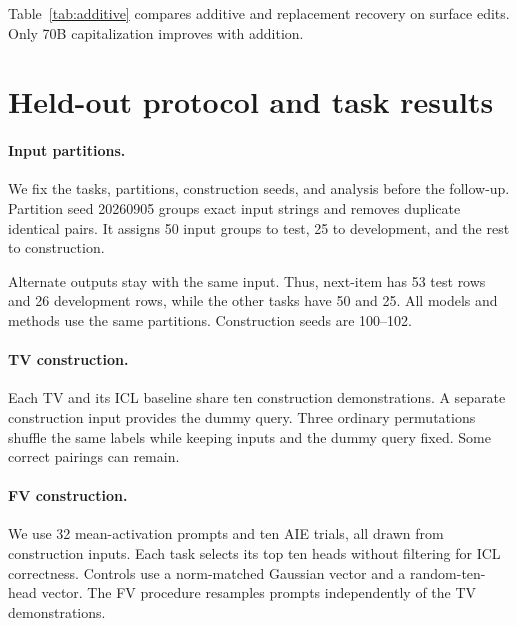 \documentclass[11pt]{article}
\begin{document}
Table~\ref{tab:additive} compares additive and replacement recovery on surface edits. Only 70B capitalization improves with addition.

\section{Held-out protocol and task results}
\label{sec:heldout-protocol}

\begin{table}[t]
  \centering
  \small
  
  \caption{Held-out accuracy (\%), averaged over seeds and tasks. Control (own) uses each control's selected layer; control (real) uses the real method's layer.}
  \label{tab:heldout-accuracy}
\end{table}

\begin{table}[t]
  \centering
  \small
  
  \caption{Held-out method-minus-control accuracy (percentage points), averaged over seeds. Controls select their own development layers.}
  \label{tab:heldout-tasks}
\end{table}

\paragraph{Input partitions.} We fix the tasks, partitions, construction seeds, and analysis before the follow-up. Partition seed 20260905 groups exact input strings and removes duplicate identical pairs. It assigns 50 input groups to test, 25 to development, and the rest to construction.

Alternate outputs stay with the same input. Thus, next-item has 53 test rows and 26 development rows, while the other tasks have 50 and 25. All models and methods use the same partitions. Construction seeds are 100--102.

\paragraph{TV construction.} Each TV and its ICL baseline share ten construction demonstrations. A separate construction input provides the dummy query. Three ordinary permutations shuffle the same labels while keeping inputs and the dummy query fixed. Some correct pairings can remain.

\paragraph{FV construction.} We use 32 mean-activation prompts and ten AIE trials, all drawn from construction inputs. Each task selects its top ten heads without filtering for ICL correctness. Controls use a norm-matched Gaussian vector and a random-ten-head vector. The FV procedure resamples prompts independently of the TV demonstrations.
\end{document}
